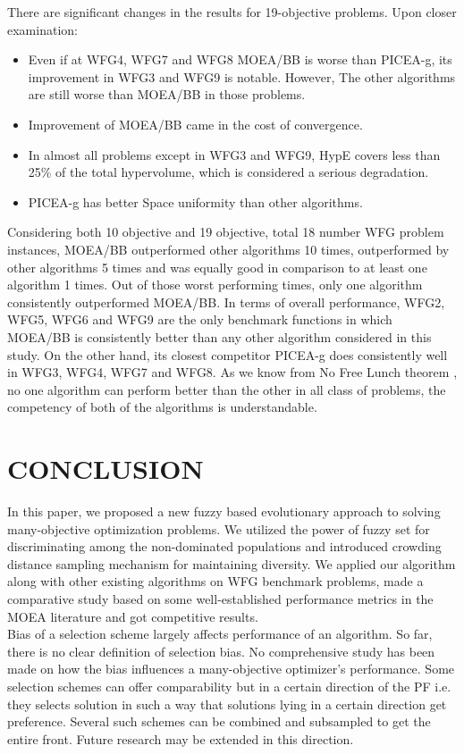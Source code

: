 \documentclass[journal]{IEEEtran}
\begin{document}

There are significant changes in the results for 19-objective problems. Upon closer examination:
\begin{itemize}
\item Even if at WFG4, WFG7 and WFG8 MOEA/BB is worse than PICEA-g, its improvement in WFG3 and WFG9 is notable. However, The other algorithms are still worse than MOEA/BB in those problems.
\item Improvement of MOEA/BB came in the cost of convergence.
\item In almost all problems except in WFG3 and WFG9, HypE covers less than 25\% of the total hypervolume, which is considered a serious degradation.
\item PICEA-g has better Space uniformity than other algorithms.
\end{itemize}
Considering both 10 objective and 19 objective, total 18 number WFG problem instances, MOEA/BB outperformed other algorithms 10 times, outperformed by other algorithms 5 times and was equally good in comparison to at least one algorithm 1 times. Out of those worst performing times, only one algorithm consistently outperformed MOEA/BB. In terms of overall performance, WFG2, WFG5, WFG6 and WFG9 are the only benchmark functions in which MOEA/BB is consistently better than any other algorithm considered in this study. On the other hand, its closest competitor PICEA-g does consistently well in WFG3, WFG4, WFG7 and WFG8. As we know from No Free Lunch theorem \cite{wolpert1997no}, no one algorithm can perform better than the other in all class of problems, the competency of both of the algorithms is understandable. 




\section{CONCLUSION}
\label{sec:conclusion}
In this paper, we proposed a new fuzzy based evolutionary approach to solving many-objective optimization problems. We utilized the power of fuzzy set for discriminating among the non-dominated populations and introduced crowding distance sampling mechanism for maintaining diversity. We applied our algorithm along with other existing algorithms on WFG benchmark problems, made a comparative study based on some well-established performance metrics in the MOEA literature and got competitive results.\\
Bias of a selection scheme largely affects performance of an algorithm. So far, there is no clear definition of selection bias. No comprehensive study has been made on how the bias influences a many-objective optimizer's performance. Some selection schemes can offer comparability but in a certain direction of the PF i.e. they selects solution in such a way that solutions lying in a certain direction get preference. Several such schemes can be combined and subsampled to get the entire front. Future research may be extended in this direction.



\ifCLASSOPTIONcaptionsoff
  \newpage
\fi





\end{document}
